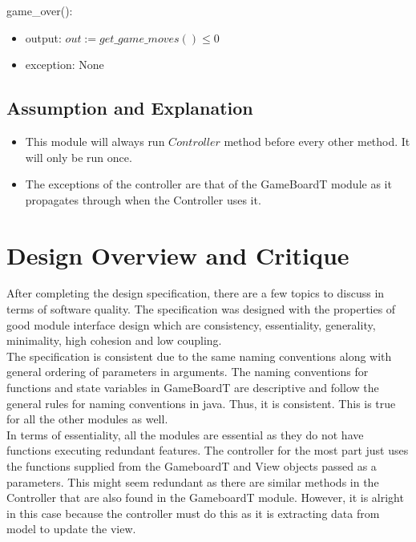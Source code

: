 \documentclass[12pt]{article}
\begin{document}
\noindent game\_over():
\begin{itemize}
\item output: $out := get\_game\_moves() \le 0$
\item exception: None
\end{itemize}

\subsection* {Assumption and Explanation}
\begin{itemize}
\item This module will always run $Controller$ method before every other method. It will only be run once.

\item The exceptions of the controller are that of the GameBoardT module as it propagates through when the Controller uses it.

\end{itemize}

\newpage

\section* {Design Overview and Critique}

After completing the design specification, there are a few topics to discuss in terms of software quality. The specification was designed with the properties of good module interface design which are consistency, essentiality,
generality, minimality, high cohesion and low coupling. \\

The specification is consistent due to the same naming conventions along with general ordering of parameters in arguments. The naming conventions for functions and state variables in GameBoardT are descriptive and follow the general rules for naming conventions in java. Thus, it is consistent. This is true for all the other modules as well.\\

In terms of essentiality, all the modules are essential as they do not have functions executing redundant features. The controller for the most part just uses the functions supplied from the GameboardT and View objects passed as a parameters. This might seem redundant as there are similar methods in the Controller that are also found in the GameboardT module. However, it is alright in this case because the controller must do this as it is extracting data from model to update the view.\\
\end{document}
